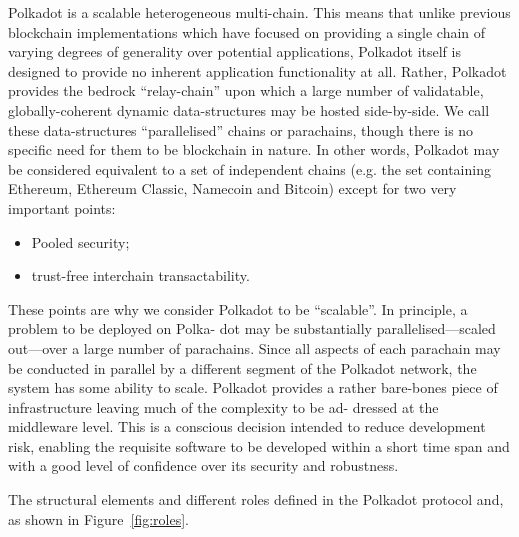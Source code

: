 Polkadot is a scalable heterogeneous multi-chain. This means that unlike previous blockchain implementations which have focused on providing a single chain of varying degrees of generality over potential applications, Polkadot itself is designed to provide no inherent application functionality at all. Rather, Polkadot provides the bedrock “relay-chain” upon which a large number of validatable, globally-coherent dynamic data-structures may be hosted side-by-side.
We call these data-structures “parallelised” chains or parachains, though there is no specific need for them to be blockchain in nature.
In other words, Polkadot may be considered equivalent to a set of independent chains (e.g. the set containing Ethereum, Ethereum Classic, Namecoin and Bitcoin) except for two very important points:
\begin{itemize}
\item Pooled security;
\item trust-free interchain transactability.
\end{itemize}
These points are why we consider Polkadot to be “scalable”. In principle, a problem to be deployed on Polka- dot may be substantially parallelised—scaled out—over a large number of parachains. Since all aspects of each parachain may be conducted in parallel by a different segment of the Polkadot network, the system has some ability to scale. Polkadot provides a rather bare-bones piece of infrastructure leaving much of the complexity to be ad- dressed at the middleware level. This is a conscious decision intended to reduce development risk, enabling the requisite software to be developed within a short time span and with a good level of confidence over its security and robustness.

The structural elements and different roles defined in the Polkadot protocol and, as shown in Figure~\ref{fig:roles}.






